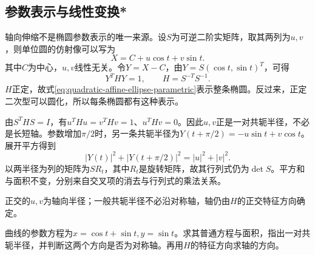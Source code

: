 \newpage
\subsection{参数表示与线性变换*}
\label{subsec:quadratic-linear-transformation}

轴向伸缩不是椭圆参数表示的唯一来源。设\(S\)为可逆二阶实矩阵，取其两列为\(u,v\)，则单位圆的仿射像可以写为
\begin{equation}\label{eq:quadratic-affine-ellipse-parametric}
    X=C+u\cos t+v\sin t .
\end{equation}
其中\(C\)为中心，\(u,v\)线性无关。令\(Y=X-C\)，由\(Y=S(\cos t,\sin t)^T\)，可得
\begin{equation*}
    Y^THY=1,\qquad H=S^{-T}S^{-1} .
\end{equation*}
\(H\)正定，故式\eqref{eq:quadratic-affine-ellipse-parametric}表示整条椭圆。反过来，正定二次型可以圆化，所以每条椭圆都有这种表示。

由\(S^THS=I\)，有\(u^THu=v^THv=1\)、\(u^THv=0\)。因此\(u,v\)正是一对共轭半径，不必是长短轴。参数增加\(\pi/2\)时，另一条共轭半径为\(Y(t+\pi/2)=-u\sin t+v\cos t\)。展开平方得到
\begin{equation*}
    |Y(t)|^2+|Y(t+\pi/2)|^2=|u|^2+|v|^2 .
\end{equation*}
以两半径为列的矩阵为\(S R_t\)，其中\(R_t\)是旋转矩阵，故其行列式仍为\(\det S\)。平方和与面积不变，分别来自交叉项的消去与行列式的乘法关系。

正交的\(u,v\)为轴向半径；一般共轭半径不必沿对称轴，轴仍由\(H\)的正交特征方向确定。

\par\noindent\begin{minipage}{\linewidth}
\begin{example}
曲线的参数方程为\(x=\cos t+\sin t,y=\sin t\)。求其普通方程与面积，指出一对共轭半径，并判断这两个方向是否为对称轴。再用\(H\)的特征方向求轴的方向。
\end{example}
\end{minipage}\par


